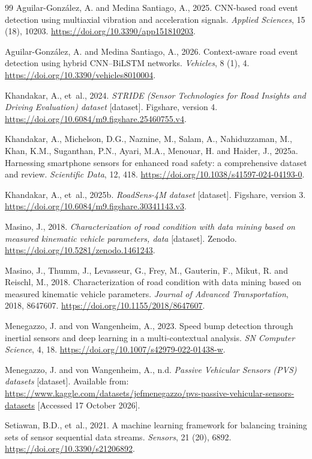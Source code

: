 \begin{thebibliography}{99}
Aguilar-Gonz\'alez, A. and Medina Santiago, A., 2025. CNN-based road event detection using multiaxial vibration and acceleration signals. \emph{Applied Sciences}, 15 (18), 10203. \url{https://doi.org/10.3390/app151810203}.

Aguilar-Gonz\'alez, A. and Medina Santiago, A., 2026. Context-aware road event detection using hybrid CNN--BiLSTM networks. \emph{Vehicles}, 8 (1), 4. \url{https://doi.org/10.3390/vehicles8010004}.

Khandakar, A., et~al., 2024. \emph{STRIDE (Sensor Technologies for Road Insights and Driving Evaluation) dataset} [dataset]. Figshare, version 4. \url{https://doi.org/10.6084/m9.figshare.25460755.v4}.

Khandakar, A., Michelson, D.G., Naznine, M., Salam, A., Nahiduzzaman, M., Khan, K.M., Suganthan, P.N., Ayari, M.A., Menouar, H. and Haider, J., 2025a. Harnessing smartphone sensors for enhanced road safety: a comprehensive dataset and review. \emph{Scientific Data}, 12, 418. \url{https://doi.org/10.1038/s41597-024-04193-0}.

Khandakar, A., et~al., 2025b. \emph{RoadSens-4M dataset} [dataset]. Figshare, version 3. \url{https://doi.org/10.6084/m9.figshare.30341143.v3}.

Masino, J., 2018. \emph{Characterization of road condition with data mining based on measured kinematic vehicle parameters, data} [dataset]. Zenodo. \url{https://doi.org/10.5281/zenodo.1461243}.

Masino, J., Thumm, J., Levasseur, G., Frey, M., Gauterin, F., Mikut, R. and Reischl, M., 2018. Characterization of road condition with data mining based on measured kinematic vehicle parameters. \emph{Journal of Advanced Transportation}, 2018, 8647607. \url{https://doi.org/10.1155/2018/8647607}.

Menegazzo, J. and von Wangenheim, A., 2023. Speed bump detection through inertial sensors and deep learning in a multi-contextual analysis. \emph{SN Computer Science}, 4, 18. \url{https://doi.org/10.1007/s42979-022-01438-w}.

Menegazzo, J. and von Wangenheim, A., n.d. \emph{Passive Vehicular Sensors (PVS) datasets} [dataset]. Available from: \url{https://www.kaggle.com/datasets/jefmenegazzo/pvs-passive-vehicular-sensors-datasets} [Accessed 17 October 2026].

Setiawan, B.D., et~al., 2021. A machine learning framework for balancing training sets of sensor sequential data streams. \emph{Sensors}, 21 (20), 6892. \url{https://doi.org/10.3390/s21206892}.
\end{thebibliography}
